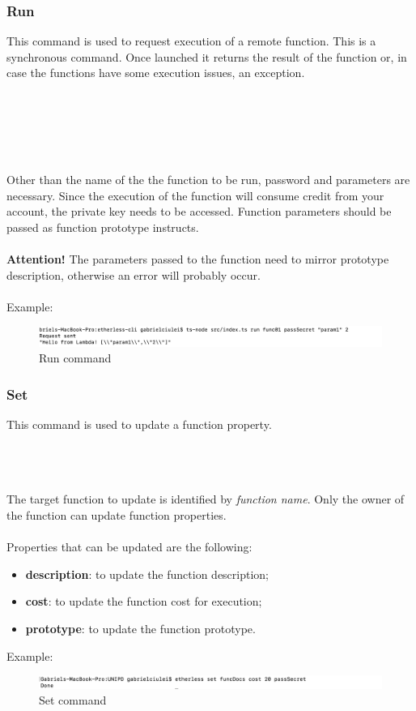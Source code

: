 \subsubsection{Run}
This command is used to request execution of a remote function. This is a synchronous command. Once launched it returns the result of the function or, in case the functions have some execution issues, an exception.\\\\
\centerline{}\\\\
\\\\Other than the name of the the function to be run, password and parameters are necessary. Since the execution of the function will consume credit from your account, the private key needs to be accessed. Function parameters should be passed as function prototype instructs.\\\\
\textbf{Attention!} The parameters passed to the function need to mirror prototype description, otherwise an error will probably occur.\\\\
Example:
\begin{figure}
	\centering
	\includegraphics[width=\textwidth]{res/img/run.png}
	\caption{Run command}
\end{figure}
\subsubsection{Set}
This command is used to update a function property.\\\\
\centerline {}\\\\
The target function to update is identified by \textit{function name}. Only the owner of the function can update function properties.\\\\
Properties that can be updated are the following:
\begin{itemize}
	\item \textbf{description}: to update the function description;
	\item \textbf{cost}: to update the function cost for execution;
	\item \textbf{prototype}: to update the function prototype.
\end{itemize}
Example:
\begin{figure}[h]
	\begin{center}
	\includegraphics[width=\textwidth]{res/img/set.png}
	\caption{Set command}
	\end{center}
\end{figure}
